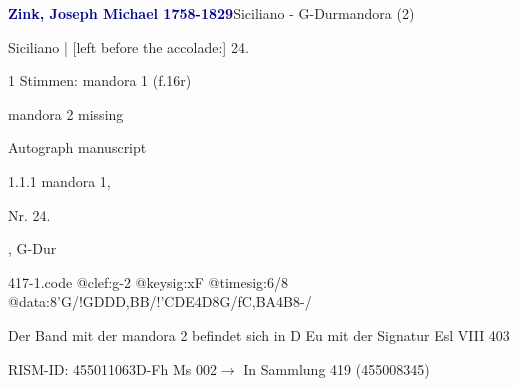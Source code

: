 \documentclass[twocolumn, 12pt]{book}
\begin{document}
\par \vspace{16pt} \textcolor{darkblue}{\textbf{Zink, Joseph Michael  1758-1829}}\hfillplus{\textbf{[417]}}\newline Siciliano - G-Dur\newline mandora (2)
\par \begin{itshape}[f.16r, at left:] Siciliano | [left before the accolade:] 24.\end{itshape} 
\par \textcolor{darkblue}{}  1 Stimmen: mandora 1  (f.16r)\newline \begin{small} mandora 2 missing\end{small} \newline Autograph manuscript
\par 1.1.1  mandora 1, \begin{itshape}Nr. 24.\end{itshape}, G-Dur  
\begin{filecontents*}{417-1.code}
@clef:g-2
@keysig:xF
@timesig:6/8
@data:8'G/!GDDD,BB/!'CDE4D8G/fC,BA4B8-/
\end{filecontents*}
\newline %
\par Der Band mit der mandora 2 befindet sich in D Eu mit der Signatur Esl VIII 403
\par RISM-ID: 455011063\newline D-Fh  Ms 002\newline $\rightarrow$ In Sammlung 419 (455008345)
      
\end{document}
